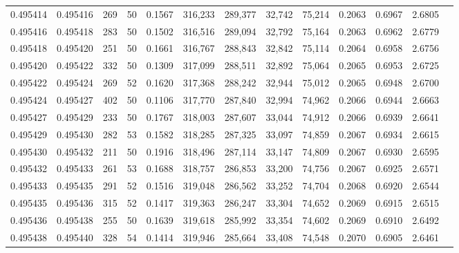 \begin{tabular}{rrrrrrrrrrrrr}
0.495414 & 0.495416 &   269 &  50 &                                     0.1567 & 316,233 & 289,377 &  32,742 &  75,214 & 0.2063 & 0.6967 & 2.6805 \\
0.495416 & 0.495418 &   283 &  50 &                                     0.1502 & 316,516 & 289,094 &  32,792 &  75,164 & 0.2063 & 0.6962 & 2.6779 \\
0.495418 & 0.495420 &   251 &  50 &                                     0.1661 & 316,767 & 288,843 &  32,842 &  75,114 & 0.2064 & 0.6958 & 2.6756 \\
0.495420 & 0.495422 &   332 &  50 &                                     0.1309 & 317,099 & 288,511 &  32,892 &  75,064 & 0.2065 & 0.6953 & 2.6725 \\
0.495422 & 0.495424 &   269 &  52 &                                     0.1620 & 317,368 & 288,242 &  32,944 &  75,012 & 0.2065 & 0.6948 & 2.6700 \\
0.495424 & 0.495427 &   402 &  50 &                                     0.1106 & 317,770 & 287,840 &  32,994 &  74,962 & 0.2066 & 0.6944 & 2.6663 \\
0.495427 & 0.495429 &   233 &  50 &                                     0.1767 & 318,003 & 287,607 &  33,044 &  74,912 & 0.2066 & 0.6939 & 2.6641 \\
0.495429 & 0.495430 &   282 &  53 &                                     0.1582 & 318,285 & 287,325 &  33,097 &  74,859 & 0.2067 & 0.6934 & 2.6615 \\
0.495430 & 0.495432 &   211 &  50 &                                     0.1916 & 318,496 & 287,114 &  33,147 &  74,809 & 0.2067 & 0.6930 & 2.6595 \\
0.495432 & 0.495433 &   261 &  53 &                                     0.1688 & 318,757 & 286,853 &  33,200 &  74,756 & 0.2067 & 0.6925 & 2.6571 \\
0.495433 & 0.495435 &   291 &  52 &                                     0.1516 & 319,048 & 286,562 &  33,252 &  74,704 & 0.2068 & 0.6920 & 2.6544 \\
0.495435 & 0.495436 &   315 &  52 &                                     0.1417 & 319,363 & 286,247 &  33,304 &  74,652 & 0.2069 & 0.6915 & 2.6515 \\
0.495436 & 0.495438 &   255 &  50 &                                     0.1639 & 319,618 & 285,992 &  33,354 &  74,602 & 0.2069 & 0.6910 & 2.6492 \\
0.495438 & 0.495440 &   328 &  54 &                                     0.1414 & 319,946 & 285,664 &  33,408 &  74,548 & 0.2070 & 0.6905 & 2.6461 \\

\end{tabular}

